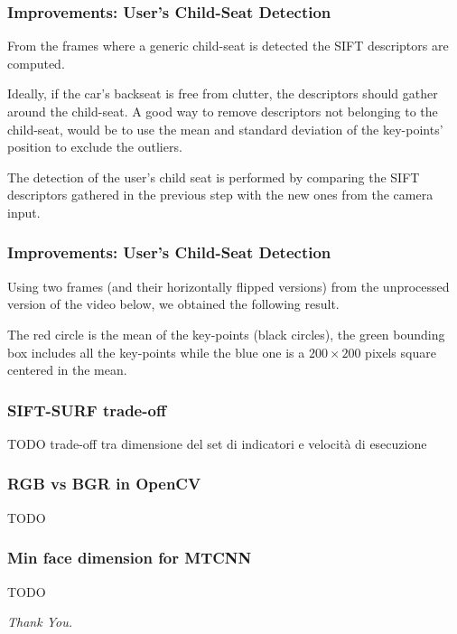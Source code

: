 \documentclass{beamer}
\begin{document}
	\begin{frame}
		\frametitle{Improvements: User's Child-Seat Detection}
		From the frames where a generic child-seat is detected the SIFT descriptors are computed.
		
		\bigskip
		
		Ideally, if the car's backseat is free from clutter, the descriptors should gather around the child-seat. A good way to remove descriptors not belonging to the child-seat, would be to use the mean and standard deviation of the key-points' position to exclude the outliers.
		
		\bigskip
		
		The detection of the user's child seat is performed by comparing the SIFT descriptors gathered in the previous step with the new ones from the camera input.
	\end{frame}

	\begin{frame}
		\frametitle{Improvements: User's Child-Seat Detection}
		Using two frames (and their horizontally flipped versions) from the unprocessed version of the video below, we obtained the following result.
		
		\bigskip
		
		\includemedia[width=\textwidth,
					 addresource=videos/BB.mp4,
					 transparent,
					 activate=pagevisible,
					 flashvars={
					 	source=videos/BB.mp4
					 	&autoplay=true
					 	&loop=false}]
		{\textcolor{white}{Video}}{VPlayer9.swf}
		
		The red circle is the mean of the key-points (black circles), the green bounding box includes all the key-points while the blue one is a $200 \times 200$ pixels square centered in the mean.
	\end{frame}

	\begin{frame}
		\frametitle{SIFT-SURF trade-off}
		TODO trade-off tra dimensione del set di indicatori e velocità di esecuzione
	\end{frame}
	
	\begin{frame}
		\frametitle{RGB vs BGR in OpenCV}
		TODO
	\end{frame}
	
	\begin{frame}
		\frametitle{Min face dimension for MTCNN}
		TODO
	\end{frame}
	
	\begin{frame}
		\centering \Huge
		\emph{Thank You.}
	\end{frame}
\end{document}
